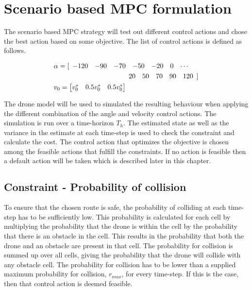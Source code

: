 \section{Scenario based MPC formulation}

The scenario based MPC strategy will test out different control actions and chose the best action based on some objective. The list of control actions is defined as follows.

\begin{align}
    & \begin{multlined} \alpha  =  [ \begin{array}{c c c c c c c}
    -120 &-90 &-70& -50& -20& 0 & \cdots \end{array}  \\ 
    \begin{array}{c c c c c} 20& 50& 70& 90& 120 \end{array}] \end{multlined} \\
     & v_0  = \begin{bmatrix}v_0^* & 0.5 v_0^* & 0.5 v_0^*\end{bmatrix}
\end{align}

The drone model will be used to simulated the resulting behaviour when applying the different combination of the angle and velocity control actions. The simulation is run over a time-horizon $T_h$. The estimated state as well as the variance in the estimate at each time-step is used to check the constraint and calculate the cost. The control action that optimizes the objective is chosen among the feasible actions that fulfill the constraints. If no action is feasible then a default action will be taken which is described later in this chapter. 

\subsection{Constraint - Probability of collision}
To ensure that the chosen route is safe, the probability of colliding at each time-step has to be sufficiently low. This probability is calculated for each cell by multiplying the probability that the drone is within the cell by the probability that there is an obstacle in the cell. This results in the probability that both the drone and an obstacle are present in that cell. The probability for collision is summed up over all cells, giving the probability that the drone will collide with any obstacle cell. The probability for collision has to be lower than a supplied maximum probability for collision, $r_{max}$, for every time-step. If this is the case, then that control action is deemed feasible.

